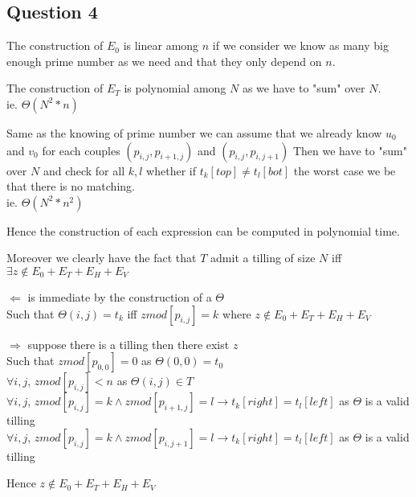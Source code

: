 \subsection{Question 4}

The construction of $E_0$ is linear among $n$ if we consider we know as many big enough prime number as we need and that they only depend on $n$.

The construction of $E_T$ is polynomial among $N$ as we have to "sum" over $N$.
\\ie. $\Theta(N^2*n)$

Same as the knowing of prime number we can assume that we already know $u_0$ and $v_0$ for each couples $(p_{i,j},p_{i+1,j})$  and $(p_{i,j},p_{i,j+1})$
Then we have to "sum" over $N$ and check for all $k,l$ whether if $t_k[top] \neq t_l[bot]$ the worst case we be that there is no matching.
\\ie. $\Theta(N^2*n^2)$

Hence the construction of each expression can  be computed in polynomial time.

Moreover we clearly have the fact that $T$ admit a tilling of size $N$ iff \\$\exists z \notin E_0+E_T+E_H+E_V$ 

$\Longleftarrow$ is immediate by the construction of a $\Theta$ 
\\Such that
 $\Theta(i, j) = t_k$ iff $z mod [p_{i,j}] = k$ where $z \notin E_0+E_T+E_H+E_V$
 
 $\Longrightarrow$ suppose there is a tilling then  there exist $z$
 \\ Such that $z mod [p_{0,0}] = 0$ as $\Theta(0,0) = t_0$
 \\$\forall i,j$, $z mod [p_{i,j}] < n$ as $\Theta(i,j) \in T$
 \\$\forall i,j$, $z mod [p_{i,j}]=k \land z mod [p_{i+1,j}]=l \rightarrow t_k[right] = t_l[left]$ as $\Theta$ is a valid tilling
 \\$\forall i,j$, $z mod [p_{i,j}]=k \land z mod [p_{i,j+1}]=l \rightarrow t_k[right] = t_l[left]$ as $\Theta$ is a valid tilling
 
 Hence $z \notin E_0+E_T+E_H+E_V$
 